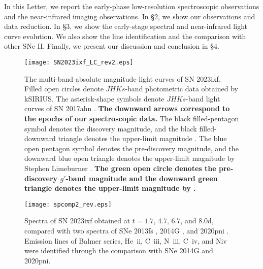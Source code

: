 \documentclass{pasj01}
\begin{document}
 In this Letter, we report the early-phase 
 low-resolution spectroscopic observations and
 the near-infrared imaging observations. In \S 2,
 we show our observations and 
 data reduction. In \S 3, we show the 
 early-stage spectral and near-infrared light
 curve evolution. We also show 
 the line identification and the 
 comparison with other SNe II. Finally,
 we present our discussion and 
 conclusion in \S 4.

\begin{figure}
 \begin{center}
  \texttt{[image: SN2023ixf\_LC\_rev2.eps]}
 \end{center}
 \caption{The multi-band absolute magnitude light curves of SN 2023ixf. Filled open circles denote $JHKs$-band photometric data 
 obtained by kSIRIUS. 
 The asterisk-shape symbols denote $JHKs$-band light curves 
 of SN 2017ahn \citep{Tartagrlia2021}. 
{\bf The downward arrows correspond to the epochs of our spectroscopic data.}
 The black 
 filled-pentagon symbol denotes the discovery magnitude, and 
 the black filled-downward triangle denotes the upper-limit 
 magnitude \citep{Itagaki2023ixf}.
 The blue open pentagon symbol denotes the pre-discovery 
 magnitude, and the downward blue open triangle denotes
 the upper-limit magnitude by Stephen Limeburner \citep{Limeburner2023}. 
 {\bf The green open circle denotes the pre-discovery $g'$-band magnitude and
 the downward green triangle denotes the upper-limit magnitude by \citet{Perley2023b}.}}
\end{figure}

\begin{figure*}
 \begin{center}
  \texttt{[image: spcomp2\_rev.eps]}
 \end{center}
 \caption{Spectra of SN 2023ixf obtained at $t=1.7$, $4.7$, $6.7$, and $8.0$d, compared with two spectra of SNe 2013fs \citep{Yaron2017}, 2014G \citep{Terreran2016}, and 2020pni \citep{Terreran2022}. Emission lines 
 of Balmer series, He~{\sc ii}, C~{\sc iii}, N~{\sc iii}, C~{\sc iv}, and N{\sc iv} were
 identified through the comparison with SNe 2014G and 2020pni. }
\end{figure*}

 
\end{document}
